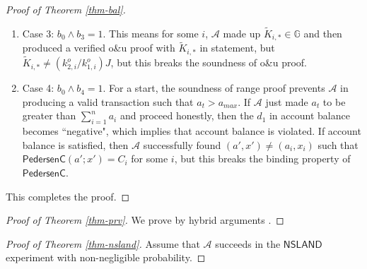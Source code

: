\documentclass{article}
\theoremstyle{plain}
\theoremstyle{remark}
\begin{document}
\begin{proof}[Proof of Theorem \ref{thm-bal}]
\begin{enumerate}
\item Case 3: $b_0 \wedge b_3 = 1$. This means for some $i$, $\mathcal{A}$ made up $\tilde{K}_{i,*}\in\mathbb{G}$ and then produced a verified o\&u proof with $\tilde{K}_{i,*}$ in statement, but $\tilde{K}_{i,*} \ne (k_{2,i}^o/k_{1,i}^o)J$, but this breaks the soundness of o\&u proof.
\item Case 4: $b_0 \wedge b_4 = 1$. For a start, the soundness of range proof prevents $\mathcal{A}$ in producing a valid transaction such that $a_t > a_{max}$. If $\mathcal{A}$ just made $a_t$ to be greater than $\sum_{i=1}^n{a_i}$ and proceed honestly, then the $d_1$ in account balance becomes ``negative", which implies that account balance is violated. If account balance is satisfied, then $\mathcal{A}$ successfully found $(a', x') \ne (a_i, x_i)$ such that $\textsf{PedersenC}(a'; x') = C_i$ for some $i$, but this breaks the binding property of $\textsf{PedersenC}$.
\end{enumerate}
This completes the proof.
\end{proof}
\begin{proof}[Proof of Theorem \ref{thm-prv}]
We prove by hybrid arguments \cite{hybrid}.
\end{proof}
\begin{proof}[Proof of Theorem \ref{thm-nsland}]
Assume that $\mathcal{A}$ succeeds in the $\textsf{NSLAND}$ experiment with non-negligible probability.
\end{proof}
\end{document}

